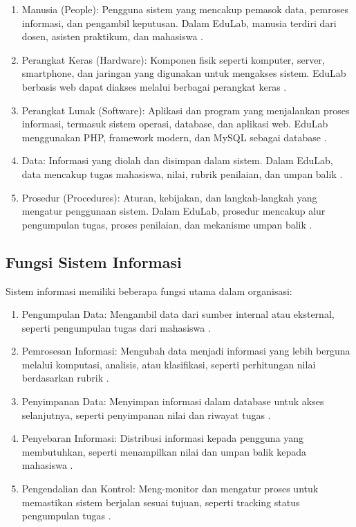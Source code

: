 \documentclass[12pt,a4paper,twoside]{report}
\begin{document}
\begin{enumerate}
    \item Manusia (People): Pengguna sistem yang mencakup pemasok data, pemroses informasi, dan pengambil keputusan. Dalam EduLab, manusia terdiri dari dosen, asisten praktikum, dan mahasiswa \cite{laudon2016}.
    
    \item Perangkat Keras (Hardware): Komponen fisik seperti komputer, server, smartphone, dan jaringan yang digunakan untuk mengakses sistem. EduLab berbasis web dapat diakses melalui berbagai perangkat keras \cite{stair2018}.
    
    \item Perangkat Lunak (Software): Aplikasi dan program yang menjalankan proses informasi, termasuk sistem operasi, database, dan aplikasi web. EduLab menggunakan PHP, framework modern, dan MySQL sebagai database \cite{stair2018}.
    
    \item Data: Informasi yang diolah dan disimpan dalam sistem. Dalam EduLab, data mencakup tugas mahasiswa, nilai, rubrik penilaian, dan umpan balik \cite{laudon2016}.
    
    \item Prosedur (Procedures): Aturan, kebijakan, dan langkah-langkah yang mengatur penggunaan sistem. Dalam EduLab, prosedur mencakup alur pengumpulan tugas, proses penilaian, dan mekanisme umpan balik \cite{stair2018}.
\end{enumerate}
\subsection{Fungsi Sistem Informasi}

Sistem informasi memiliki beberapa fungsi utama dalam organisasi:

\begin{enumerate}
    \item Pengumpulan Data: Mengambil data dari sumber internal atau eksternal, seperti pengumpulan tugas dari mahasiswa \cite{laudon2016}.
    \item Pemrosesan Informasi: Mengubah data menjadi informasi yang lebih berguna melalui komputasi, analisis, atau klasifikasi, seperti perhitungan nilai berdasarkan rubrik \cite{stair2018}.
    \item Penyimpanan Data: Menyimpan informasi dalam database untuk akses selanjutnya, seperti penyimpanan nilai dan riwayat tugas \cite{laudon2016}.
    \item Penyebaran Informasi: Distribusi informasi kepada pengguna yang membutuhkan, seperti menampilkan nilai dan umpan balik kepada mahasiswa \cite{stair2018}.
    \item Pengendalian dan Kontrol: Meng-monitor dan mengatur proses untuk memastikan sistem berjalan sesuai tujuan, seperti tracking status pengumpulan tugas \cite{laudon2016}.
\end{enumerate}
\end{document}
